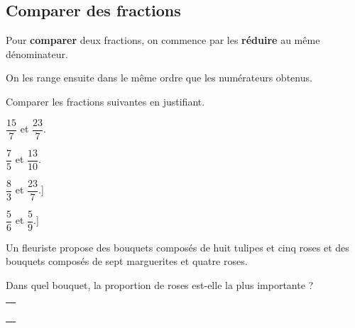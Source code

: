 \documentclass[a4paper]{book}
\begin{document}
\subsection{Comparer des fractions}
    \begin{propriete}
        Pour \textbf{comparer} deux fractions, on commence par les \textbf{réduire} au même dénominateur.
        
        On les range ensuite dans le même ordre que les numérateurs obtenus.
    \end{propriete}


    \begin{exemple}
        Comparer les fractions suivantes en justifiant.

        \begin{minipage}{0.24\linewidth}
            $\dfrac{15}{7}$ et $\dfrac{23}{7}$.

            \vspace{2cm}
        \end{minipage}
        \hfill\vline\hfill
        \begin{minipage}{0.24\linewidth}
            $\dfrac{7}{5}$ et $\dfrac{13}{10}$.

            \vspace{2cm}
        \end{minipage}
        \hfill\vline\hfill
        \begin{minipage}{0.24\linewidth}
            $\dfrac{8}{3}$ et $\dfrac{23}{7}$.]

            \vspace{2cm}
        \end{minipage}
        \hfill\vline\hfill
        \begin{minipage}{0.24\linewidth}
            $\dfrac{5}{6}$ et $\dfrac{5}{9}$.]

            \vspace{2cm}
        \end{minipage}
    \end{exemple}
    

    \begin{exemple}
        Un fleuriste propose des bouquets composés de huit tulipes et cinq roses et des bouquets composés de sept marguerites et quatre roses. 
                
        Dans quel bouquet, la proportion de roses est-elle la plus importante ?

        \medskip

        \begin{tabular}{|p{16cm}|}
            \hline \\ \\ \\ \\ \\ \hline            
        \end{tabular}
    \end{exemple}
\end{document}
